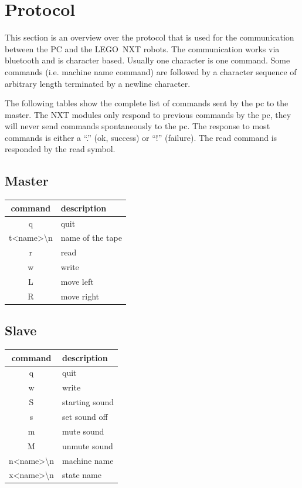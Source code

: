 \documentclass[%
  a4paper,%
  11pt,%
  blue,%
  hyperref	%
  ]{tubsartcl}
\begin{document}
\section{Protocol}

This section is an overview over the protocol that is used for the communication between the PC and the LEGO\textregistered\, NXT robots. The communication works via bluetooth and is character based. Usually one character is one command. Some commands (i.e. machine name command) are followed by a character sequence of arbitrary length terminated by a newline character.

The following tables show the complete list of commands sent by the pc to the master. The NXT modules only respond to previous commands by the pc, they will never send commands spontaneously to the pc. The response to most commands is either a ``.'' (ok, success) or ``!'' (failure). The read command is responded by the read symbol.

\begin{minipage}{5cm}
\subsection{Master}
\begin{tabular}{c|l}
command & description\\
\hline
q & quit\\
t<name>\textbackslash n & name of the tape\\
r & read\\
w & write\\
L & move left\\
R & move right
\end{tabular}
\vspace{1cm}
\end{minipage}
\hspace{2cm}
\begin{minipage}{5cm}
\subsection{Slave}
\begin{tabular}{c|l}
command & description\\
\hline
q & quit\\
w & write\\
S & starting sound\\
s & set sound off\\
m & mute sound\\
M & unmute sound\\
n<name>\textbackslash n & machine name\\
x<name>\textbackslash n & state name
\end{tabular}
\end{minipage}


\makebackpage[trisec]%
\end{document}
